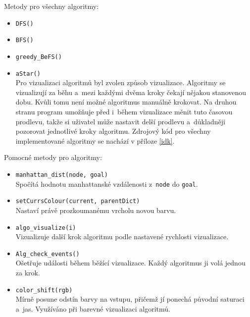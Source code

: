 \documentclass[12pt]{report}			%
\begin{document}
Metody pro všechny algoritmy:
\begin{itemize}
			\setlength\itemsep{0.01mm}
\item \texttt{DFS()}
\item \texttt{BFS()}
\item \texttt{greedy\_BeFS()}
\item \texttt{aStar()}\\
Pro vizualizaci algoritmů byl zvolen  způsob vizualizace. Algoritmy se vizualizují za běhu a~mezi každými dvěma kroky čekají nějakou stanovenou dobu. Kvůli tomu není možné algoritmus manuálně krokovat. Na druhou stranu program umožňuje před i~během vizualizace měnit tuto časovou prodlevu, takže si uživatel může nastavit delší prodlevu a~důkladněji pozorovat jednotlivé kroky algoritmu. Zdrojový kód pro všechny implementované algoritmy se nachází v příloze \ref{idk}. 
\end{itemize}

Pomocné metody pro algoritmy:
\begin{itemize}
\setlength\itemsep{0.01mm}
\item \texttt{manhattan\_dist(node, goal)}\\
Spočítá hodnotu manhattanské vzdálenosti z~\texttt{node} do \texttt{goal}.
\item \texttt{setCurrsColour(current, parentDict)}\\
Nastaví právě prozkoumanému vrcholu novou barvu.
\item \texttt{algo\_visualize(i)}\\
Vizualizuje další krok algoritmu podle nastavené rychlosti vizualizace.






\item \texttt{Alg\_check\_events()}\\
Ošetřuje události během  běžící vizualizace. Každý algoritmus ji volá jednou za krok. 
\item \texttt{color\_shift(rgb)}\\
Mírně posune odstín barvy na vstupu, přičemž jí ponechá původní saturaci a~jas. Využíváno při barevné vizualizaci algoritmů.
\end{itemize}
\end{document}
